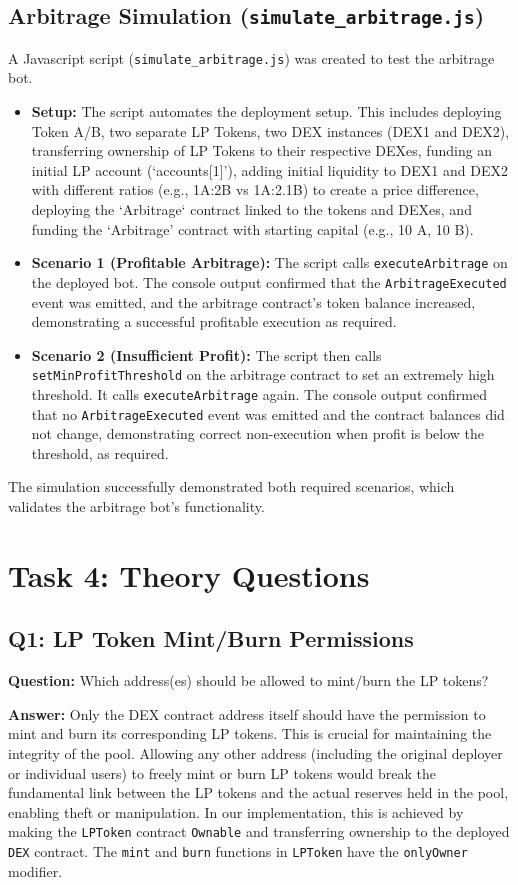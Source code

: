 \documentclass[12pt]{article}
\begin{document}
\subsection{Arbitrage Simulation (\texttt{simulate\_arbitrage.js})}
A Javascript script (\texttt{simulate\_arbitrage.js}) was created to test the arbitrage bot.
\begin{itemize}
    \item \textbf{Setup:} The script automates the deployment setup. This includes deploying Token A/B, two separate LP Tokens, two DEX instances (DEX1 and DEX2), transferring ownership of LP Tokens to their respective DEXes, funding an initial LP account (`accounts[1]'), adding initial liquidity to DEX1 and DEX2 with different ratios (e.g., 1A:2B vs 1A:2.1B) to create a price difference, deploying the `Arbitrage` contract linked to the tokens and DEXes, and funding the `Arbitrage' contract with starting capital (e.g., 10 A, 10 B).
    \item \textbf{Scenario 1 (Profitable Arbitrage):} The script calls \texttt{executeArbitrage} on the deployed bot. The console output confirmed that the \texttt{ArbitrageExecuted} event was emitted, and the arbitrage contract's token balance increased, demonstrating a successful profitable execution as required.
    \item \textbf{Scenario 2 (Insufficient Profit):} The script then calls \texttt{setMinProfitThreshold} on the arbitrage contract to set an extremely high threshold. It calls \texttt{executeArbitrage} again. The console output confirmed that no \texttt{ArbitrageExecuted} event was emitted and the contract balances did not change, demonstrating correct non-execution when profit is below the threshold, as required.
\end{itemize}
The simulation successfully demonstrated both required scenarios, which validates the arbitrage bot's functionality.

\section{Task 4: Theory Questions}

\subsection{Q1: LP Token Mint/Burn Permissions}
\textbf{Question:} Which address(es) should be allowed to mint/burn the LP tokens?

\textbf{Answer:} Only the DEX contract address itself should have the permission to mint and burn its corresponding LP tokens. This is crucial for maintaining the integrity of the pool.
Allowing any other address (including the original deployer or individual users) to freely mint or burn LP tokens would break the fundamental link between the LP tokens and the actual reserves held in the pool, enabling theft or manipulation. In our implementation, this is achieved by making the \texttt{LPToken} contract \texttt{Ownable} and transferring ownership to the deployed \texttt{DEX} contract. The \texttt{mint} and \texttt{burn} functions in \texttt{LPToken} have the \texttt{onlyOwner} modifier.
\end{document}
